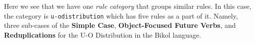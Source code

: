 Here we see that we have one \textit{rule category} that groups similar rules. In this case, the category is \texttt{u-o\textunderscore distribution} which has five rules as a part of it. Namely, three sub-cases of the \textbf{Simple Case}, \textbf{Object-Focused Future Verbs}, and \textbf{Reduplications} for the U-O Distribution in the Bikol language.

